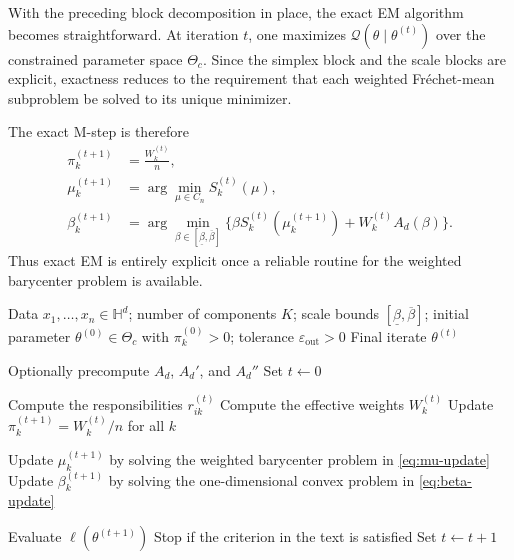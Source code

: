 \documentclass[11pt]{article}
\begin{document}
With the preceding block decomposition in place, the exact EM algorithm becomes straightforward. At iteration \(t\), one maximizes \(\mathcal{Q}(\theta\mid\theta^{(t)})\) over the constrained parameter space \(\Theta_c\). Since the simplex block and the scale blocks are explicit, exactness reduces to the requirement that each weighted Fr\'echet-mean subproblem be solved to its unique minimizer.

The exact M-step is therefore
\begin{align}
\pi_k^{(t+1)}
&=
\frac{W_k^{(t)}}{n},
\label{eq:pi-update}
\\
\mu_k^{(t+1)}
&=
\arg\min_{\mu\in C_n} S_k^{(t)}(\mu),
\label{eq:mu-update}
\\
\beta_k^{(t+1)}
&=
\arg\min_{\beta\in[\underline{\beta},\overline{\beta}]}
\Big\{
\beta S_k^{(t)}(\mu_k^{(t+1)})
+
W_k^{(t)}A_d(\beta)
\Big\}.
\label{eq:beta-update}
\end{align}
Thus exact EM is entirely explicit once a reliable routine for the weighted barycenter problem is available.

\begin{algorithm}[t]
\caption{Exact EM for constrained Riemannian Gaussian mixtures}
\label{alg:exact-em}
\begin{algorithmic}[1]
\REQUIRE Data \(x_1,\ldots,x_n\in\mathbb{H}^d\); number of components \(K\); scale bounds \([\underline{\beta},\overline{\beta}]\); initial parameter \(\theta^{(0)}\in\Theta_c\) with \(\pi_k^{(0)}>0\); tolerance \(\varepsilon_{\mathrm{out}}>0\)
\ENSURE Final iterate \(\theta^{(t)}\)

\STATE Optionally precompute \(A_d\), \(A_d'\), and \(A_d''\)
\STATE Set \(t\gets 0\)

    \STATE Compute the responsibilities \(r_{ik}^{(t)}\)
    \STATE Compute the effective weights \(W_k^{(t)}\)
    \STATE Update \(\pi_k^{(t+1)}=W_k^{(t)}/n\) for all \(k\)

        \STATE Update \(\mu_k^{(t+1)}\) by solving the weighted barycenter problem in \eqref{eq:mu-update}
        \STATE Update \(\beta_k^{(t+1)}\) by solving the one-dimensional convex problem in \eqref{eq:beta-update}
    \ENDFOR

    \STATE Evaluate \(\ell(\theta^{(t+1)})\)
    \STATE Stop if the criterion in the text is satisfied
    \STATE Set \(t\gets t+1\)
\ENDWHILE
\end{algorithmic}
\end{algorithm}
\end{document}
